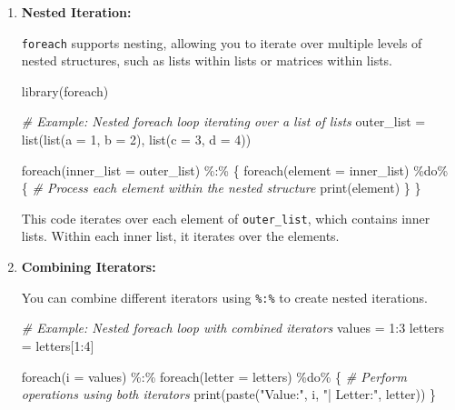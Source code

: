 \documentclass[
]{article}
\newenvironment{Shaded}{}{}
\newcommand{\AttributeTok}[1]{\textcolor[rgb]{0.49,0.56,0.16}{#1}}
\newcommand{\CommentTok}[1]{\textcolor[rgb]{0.38,0.63,0.69}{\textit{#1}}}
\newcommand{\DecValTok}[1]{\textcolor[rgb]{0.25,0.63,0.44}{#1}}
\newcommand{\FunctionTok}[1]{\textcolor[rgb]{0.02,0.16,0.49}{#1}}
\newcommand{\NormalTok}[1]{#1}
\newcommand{\OtherTok}[1]{\textcolor[rgb]{0.00,0.44,0.13}{#1}}
\newcommand{\SpecialCharTok}[1]{\textcolor[rgb]{0.25,0.44,0.63}{#1}}
\newcommand{\StringTok}[1]{\textcolor[rgb]{0.25,0.44,0.63}{#1}}
\begin{document}
\begin{enumerate}
\def\labelenumi{\arabic{enumi}.}
\item
  \textbf{Nested Iteration:}

  \texttt{foreach} supports nesting, allowing you to iterate over
  multiple levels of nested structures, such as lists within lists or
  matrices within lists.

\begin{Shaded}
\begin{Highlighting}[]
\FunctionTok{library}\NormalTok{(foreach)}

\CommentTok{\# Example: Nested foreach loop iterating over a list of lists}
\NormalTok{outer\_list }\OtherTok{=} \FunctionTok{list}\NormalTok{(}\FunctionTok{list}\NormalTok{(}\AttributeTok{a =} \DecValTok{1}\NormalTok{, }\AttributeTok{b =} \DecValTok{2}\NormalTok{), }\FunctionTok{list}\NormalTok{(}\AttributeTok{c =} \DecValTok{3}\NormalTok{, }\AttributeTok{d =} \DecValTok{4}\NormalTok{))}

\FunctionTok{foreach}\NormalTok{(}\AttributeTok{inner\_list =}\NormalTok{ outer\_list) }\SpecialCharTok{\%:\%}\NormalTok{ \{}
  \FunctionTok{foreach}\NormalTok{(}\AttributeTok{element =}\NormalTok{ inner\_list) }\SpecialCharTok{\%do\%}\NormalTok{ \{}
    \CommentTok{\# Process each element within the nested structure}
    \FunctionTok{print}\NormalTok{(element)}
\NormalTok{  \}}
\NormalTok{\}}
\end{Highlighting}
\end{Shaded}

  This code iterates over each element of \texttt{outer\_list}, which
  contains inner lists. Within each inner list, it iterates over the
  elements.
\item
  \textbf{Combining Iterators:}

  You can combine different iterators using \texttt{\%:\%} to create
  nested iterations.

\begin{Shaded}
\begin{Highlighting}[]
\CommentTok{\# Example: Nested foreach loop with combined iterators}
\NormalTok{values }\OtherTok{=} \DecValTok{1}\SpecialCharTok{:}\DecValTok{3}
\NormalTok{letters }\OtherTok{=}\NormalTok{ letters[}\DecValTok{1}\SpecialCharTok{:}\DecValTok{4}\NormalTok{]}

\FunctionTok{foreach}\NormalTok{(}\AttributeTok{i =}\NormalTok{ values) }\SpecialCharTok{\%:\%} \FunctionTok{foreach}\NormalTok{(}\AttributeTok{letter =}\NormalTok{ letters) }\SpecialCharTok{\%do\%}\NormalTok{ \{}
  \CommentTok{\# Perform operations using both iterators}
  \FunctionTok{print}\NormalTok{(}\FunctionTok{paste}\NormalTok{(}\StringTok{"Value:"}\NormalTok{, i, }\StringTok{"| Letter:"}\NormalTok{, letter))}
\NormalTok{\}}
\end{Highlighting}
\end{Shaded}


\end{enumerate}
\end{document}
